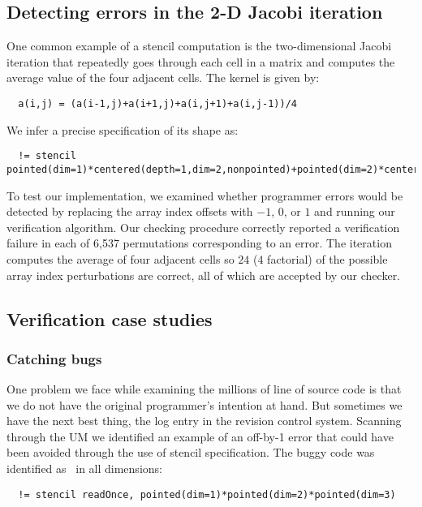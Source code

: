 \subsection{Detecting errors in the 2-D Jacobi iteration}
\label{sec:jacobi}
One common example of a stencil computation is the two-dimensional
Jacobi iteration that repeatedly goes through each cell in a matrix
and computes the average value of the four adjacent cells. The kernel
is given by:
\begin{verbatim}
  a(i,j) = (a(i-1,j)+a(i+1,j)+a(i,j+1)+a(i,j-1))/4
\end{verbatim}
We infer a precise specification of its shape as:
\begin{verbatim}
  != stencil pointed(dim=1)*centered(depth=1,dim=2,nonpointed)+pointed(dim=2)*centered(depth=1,dim=1,nonpointed)
\end{verbatim}
%
To test our implementation,
we examined whether programmer errors would be detected by replacing
the array index offsets with $-1$, $0$, or $1$ and running our
verification algorithm. Our checking procedure correctly reported a verification
failure in each of 6,537 permutations corresponding to an error.
The iteration computes the average of four adjacent
cells so $24$ ($4$ factorial) of the possible array index perturbations
are correct, all of which are accepted by our checker.

\subsection{Verification case studies}
\label{sec:case-studies}

\subsubsection{Catching bugs}

One problem we face while examining the millions of line of source
code is that we do not have the original programmer's intention at
hand. But sometimes we have the next best thing, the log entry in the
revision control system. Scanning through the UM we identified an
example of an off-by-1 error that could have been avoided through the
use of stencil specification. The buggy code was identified as
\pointed\ in all dimensions:

\begin{verbatim}
  != stencil readOnce, pointed(dim=1)*pointed(dim=2)*pointed(dim=3)
\end{verbatim}

